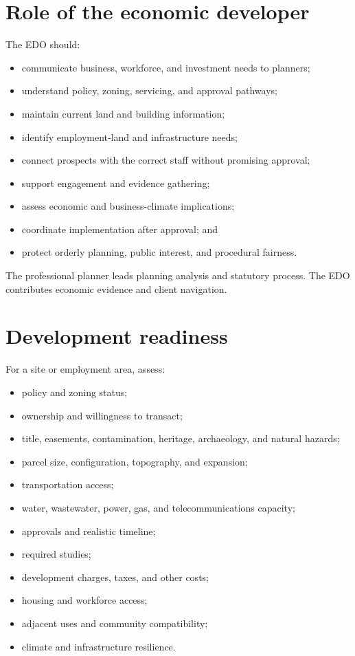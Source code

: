 \documentclass[11pt,letterpaper,oneside,openany]{book}
\begin{document}
\section[Role of the economic developer]{Role of the economic developer}
The EDO should:


\begin{itemize}
\item communicate business, workforce, and investment needs to planners;
\item understand policy, zoning, servicing, and approval pathways;
\item maintain current land and building information;
\item identify employment-land and infrastructure needs;
\item connect prospects with the correct staff without promising approval;
\item support engagement and evidence gathering;
\item assess economic and business-climate implications;
\item coordinate implementation after approval; and
\item protect orderly planning, public interest, and procedural fairness.
\end{itemize}


The professional planner leads planning analysis and statutory process. The EDO contributes economic evidence and client navigation.


\section[Development readiness]{Development readiness}
For a site or employment area, assess:


\begin{itemize}
\item policy and zoning status;
\item ownership and willingness to transact;
\item title, easements, contamination, heritage, archaeology, and natural hazards;
\item parcel size, configuration, topography, and expansion;
\item transportation access;
\item water, wastewater, power, gas, and telecommunications capacity;
\item approvals and realistic timeline;
\item required studies;
\item development charges, taxes, and other costs;
\item housing and workforce access;
\item adjacent uses and community compatibility;
\item climate and infrastructure resilience.
\end{itemize}
\end{document}
